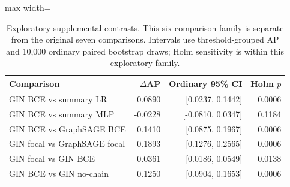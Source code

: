 \begin{table}[H]
\centering\small
\caption{Exploratory supplemental contrasts. This six-comparison family is separate from the original seven comparisons. Intervals use threshold-grouped AP and 10,000 ordinary paired bootstrap draws; Holm sensitivity is within this exploratory family.}
\begin{adjustbox}{max width=\linewidth}
\begin{tabular}{lrrr}
\toprule Comparison & $\Delta$AP & Ordinary 95\% CI & Holm $p$\\\midrule
GIN BCE vs summary LR & 0.0890 & [0.0237, 0.1442] & 0.0006\\
GIN BCE vs summary MLP & -0.0228 & [-0.0810, 0.0347] & 0.1184\\
GIN BCE vs GraphSAGE BCE & 0.1410 & [0.0875, 0.1967] & 0.0006\\
GIN focal vs GraphSAGE focal & 0.1893 & [0.1276, 0.2565] & 0.0006\\
GIN focal vs GIN BCE & 0.0361 & [0.0186, 0.0549] & 0.0138\\
GIN BCE vs GIN no-chain & 0.1250 & [0.0904, 0.1653] & 0.0006\\
\bottomrule\end{tabular}\end{adjustbox}
\end{table}
